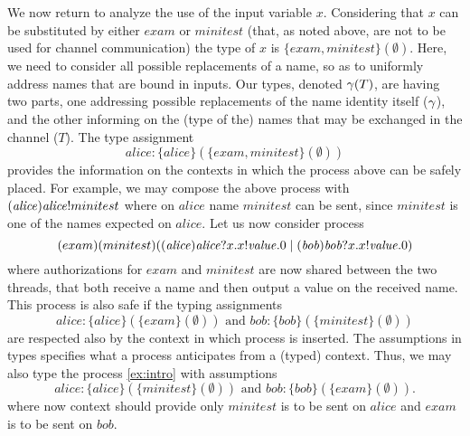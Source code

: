 We now return to analyze the use of the input variable $\mathit{x}$. Considering that $x$ can be 
substituted by either $\mathit{exam}$ or $\mathit{minitest}$ (that, as noted above, are not to be used for
channel communication) the type of $x$ is $\{\mathit{exam},\mathit{minitest}\} ( \emptyset )$.
Here, we need to consider all possible replacements of a name, so as to uniformly
address names that are bound in inputs. Our types, denoted $\gamma(T)$, are having two parts, one 
addressing possible replacements of the name identity itself ($\gamma$), and the other 
informing on the (type of the) names that may be exchanged in the channel ($T$).
%
The type assignment 
\[
    { \mathit{alice}: \{\mathit{alice}\}( \{\mathit{exam},\mathit{minitest}\} ( \emptyset ))}
\]
provides the information on the contexts in which the process above can be safely placed. For example,
we may compose the above process with 
$(\mathit{alice})\mathit{alice}!minitest$
where on $\mathit{alice}$ name $\mathit{minitest}$ can be sent, since $\mathit{minitest}$
is one of the names expected on $\mathit{alice}$.
Let us now consider process
%
\begin{equation}
\label{ex:intro}
(exam)(minitest)
((\mathit{alice})\mathit{alice}?x.
x!\mathit{value}. 0
\;|\; 
(\mathit{bob})\mathit{bob}?x.
x!\mathit{value}. 0)
\end{equation}
%
where authorizations for $\mathit{exam}$ and $\mathit{minitest}$ are now shared between the two threads, that both receive a name and then output a value on the received name. This process is also safe if the
typing assignments
\[
{\mathit{alice}: \{\mathit{alice}\}( \{\mathit{exam}\} ( \emptyset )) \text{ and }
\mathit{bob}: \{\mathit{bob}\}( \{\mathit{minitest}\} ( \emptyset ))}
\]
are respected also by the context in which process is inserted.
The assumptions in types specifies what a process anticipates from a (typed) context. 
Thus, we may also type the  process \eqref{ex:intro}  with assumptions 
\[
\mathit{alice}: \{\mathit{alice}\} ( \{\mathit{minitest}\} ( \emptyset ))\text{ and }\mathit{bob}: \{\mathit{bob}\} ( \{\mathit{exam}\} ( \emptyset )). 
\]
where now context should provide only $\mathit{minitest}$ is to be sent on $\mathit{alice}$ and $\mathit{exam}$ is to be sent on $\mathit{bob}$.

